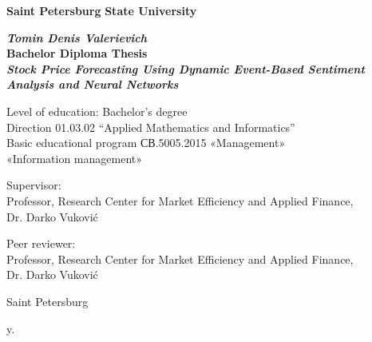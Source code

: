 \begin{titlepage}
\begin{center}

\textbf{Saint Petersburg}
\textbf{State University}

\vspace{35mm}

\textbf{\textit{\large Tomin Denis Valerievich}} \\[8mm]
\textbf{\large Bachelor Diploma Thesis}\\[3mm]
\textbf{\textit{\large Stock Price Forecasting Using Dynamic Event-Based Sentiment Analysis and Neural Networks}}

\vspace{20mm}
Level of education: Bachelor's degree\\
Direction 01.03.02 “Applied Mathematics and Informatics”\\
Basic educational program СВ.5005.2015
«Management»\\
«Information management»\\[25mm]


\begin{flushright}
\begin{minipage}[t]{0.65\textwidth}
{Supervisor:} \\
Professor, Research Center for Market Efficiency and Applied Finance, \\ Dr. Darko Vuković

\vspace{10mm}

{Peer reviewer:} \\
Professor, Research Center for Market Efficiency and Applied Finance, \\ Dr. Darko Vuković
\end{minipage}
\end{flushright}

\vfill

{Saint Petersburg}
\par{\the\year{} y.}
\end{center}
\end{titlepage}
\restoregeometry
\addtocounter{page}{1}